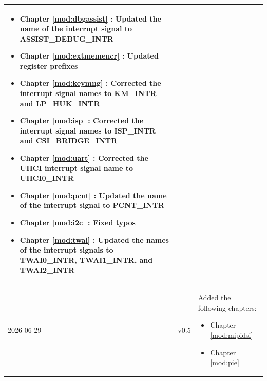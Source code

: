 \begin{longtable}[l]{ | m{2cm} | m{1.5cm} | m{12cm} | }
\begin{itemize}
        \item Chapter \ref{mod:dbgassist} \textit{\nameref{mod:dbgassist}}: Updated the name of the interrupt signal to ASSIST\_DEBUG\_INTR %
        \item Chapter \ref{mod:extmemencr} \textit{\nameref{mod:extmemencr}}: Updated register prefixes
        \item Chapter \ref{mod:keymng} \textit{\nameref{mod:keymng}}: Corrected the interrupt signal names to KM\_INTR and LP\_HUK\_INTR %
        \item Chapter \ref{mod:isp} \textit{\nameref{mod:isp}}: Corrected the interrupt signal names to ISP\_INTR and CSI\_BRIDGE\_INTR %
        \item Chapter \ref{mod:uart} \textit{\nameref{mod:uart}}: Corrected the UHCI interrupt signal name to UHCI0\_INTR %
        \item Chapter \ref{mod:pcnt} \textit{\nameref{mod:pcnt}}: Updated the name of the interrupt signal to PCNT\_INTR
        \item Chapter \ref{mod:i2c} \textit{\nameref{mod:i2c}}: Fixed typos %
        \item Chapter \ref{mod:twai} \textit{\nameref{mod:twai}}: Updated the names of the interrupt signals to TWAI0\_INTR, TWAI1\_INTR, and TWAI2\_INTR %
    \end{itemize}
    \\\hline
    2026-06-29 & v0.5 &
    Added the following chapters:
    \begin{itemize}
        \item Chapter \ref{mod:mipidsi} \textit{\nameref{mod:mipidsi}}
        \item Chapter \ref{mod:pie} \textit{\nameref{mod:pie}}
    \end{itemize}


\end{longtable}
